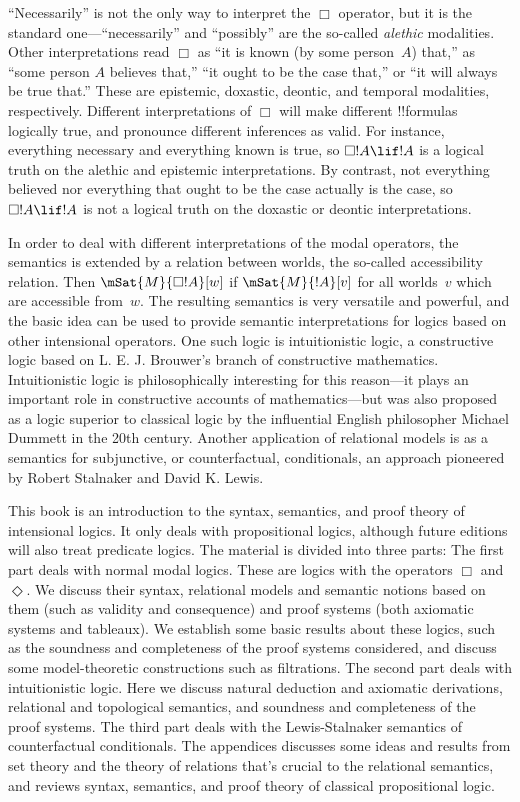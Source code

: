 ``Necessarily'' is not the only way to interpret the $\Box$ operator,
but it is the standard one---``necessarily'' and ``possibly'' are the
so-called \emph{alethic} modalities. Other interpretations read $\Box$
as ``it is known (by some person~$A$) that,'' as ``some person $A$
believes that,'' ``it ought to be the case that,'' or ``it will always
be true that.'' These are epistemic, doxastic, deontic, and temporal
modalities, respectively. Different interpretations of $\Box$ will
make different !!{formula}s logically true, and pronounce different
inferences as valid. For instance, everything necessary and everything
known is true, so $\Box !A \lif !A$ is a logical truth on the alethic
and epistemic interpretations. By contrast, not everything believed
nor everything that ought to be the case actually is the case, so
$\Box !A \lif !A$ is not a logical truth on the doxastic or deontic
interpretations. 

In order to deal with different interpretations of the modal
operators, the semantics is extended by a relation between worlds, the
so-called accessibility relation.  Then $\mSat{M}{\Box !A}[w]$ if
$\mSat{M}{!A}[v]$ for all worlds~$v$ which are accessible from~$w$.
The resulting semantics is very versatile and powerful, and the basic
idea can be used to provide semantic interpretations for logics based
on other intensional operators. One such logic is intuitionistic
logic, a constructive logic based on L. E. J. Brouwer's branch of
constructive mathematics. Intuitionistic logic is philosophically
interesting for this reason---it plays an important role in
constructive accounts of mathematics---but was also proposed as a logic
superior to classical logic by the influential English philosopher
Michael Dummett in the 20th century. Another application of relational
models is as a semantics for subjunctive, or counterfactual,
conditionals, an approach pioneered by Robert Stalnaker and David K.
Lewis.

This book is an introduction to the syntax, semantics, and proof
theory of intensional logics. It only deals with propositional logics,
although future editions will also treat predicate logics.  The
material is divided into three parts: The first part deals with normal
modal logics. These are logics with the operators $\Box$
and~$\Diamond$. We discuss their syntax, relational models and
semantic notions based on them (such as validity and consequence) and
proof systems (both axiomatic systems and tableaux). We establish some
basic results about these logics, such as the soundness and
completeness of the proof systems considered, and discuss some
model-theoretic constructions such as filtrations. The second part
deals with intuitionistic logic. Here we discuss natural deduction and
axiomatic derivations, relational and topological semantics, and
soundness and completeness of the proof systems. The third part deals
with the Lewis-Stalnaker semantics of counterfactual conditionals. The
appendices discusses some ideas and results from set theory and the
theory of relations that's crucial to the relational semantics, and
reviews syntax, semantics, and proof theory of classical propositional
logic.
